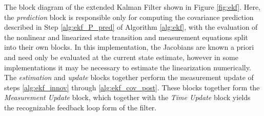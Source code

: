The block diagram of the extended Kalman Filter shown in Figure \ref{fig:ekf}. Here, the \emph{prediction} block is responsible only for computing the covariance prediction described in Step \ref{alg:ekf_P_pred} of Algorithm \ref{alg:ekf}, with the evaluation of the nonlinear and linearized state transition and measurement equations split into their own blocks. In this implementation, the Jacobians are known a priori and need only be evaluated at the current state estimate, however in some implementations it may be necessary to estimate the linearization numerically. The \emph{estimation} and \emph{update} blocks together perform the measurement update of steps \ref{alg:ekf_innov} through \ref{alg:ekf_cov_post}. These blocks together form the \emph{Measurement Update} block, which together with the \emph{Time Update} block yields the recognizable feedback loop form of the filter.

